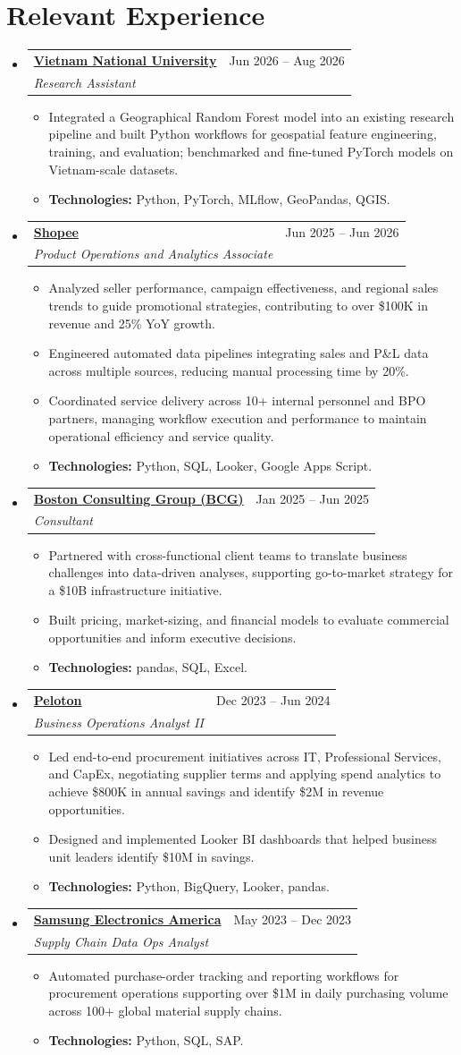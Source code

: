 \documentclass[a4paper,11pt]{article}
\makeatletter
\newcommand{\resumeItem}[1]{
  \item\small{
    {#1\par\vspace{-2pt}}
  }
}
\newcommand{\resumeSubheading}[4]{
  \vspace{-2pt}\item
    \begin{tabular*}{0.97\textwidth}[t]{l@{\extracolsep{\fill}}r}
      \textbf{#1} & #2 \\
      \textit{\small#3} & \textit{\small #4} \\
    \end{tabular*}\vspace{-7pt}
}
\newcommand{\resumeSubHeadingListStart}{\begin{itemize}[leftmargin=0.15in, label={}]}
\newcommand{\resumeSubHeadingListEnd}{\end{itemize}}
\newcommand{\resumeItemListStart}{\begin{itemize}}
\newcommand{\resumeItemListEnd}{\end{itemize}\vspace{-5pt}}
\makeatother
\begin{document}
\section{Relevant Experience}
\resumeSubHeadingListStart
  \resumeSubheading
    {\href{https://en.vnu.edu.vn/}{Vietnam National University}}{Jun 2026 -- Aug 2026}
    {Research Assistant}{}
    \resumeItemListStart
      \resumeItem{Integrated a Geographical Random Forest model into an existing research pipeline and built Python workflows for geospatial feature engineering, training, and evaluation; benchmarked and fine-tuned PyTorch models on Vietnam-scale datasets.}
      \resumeItem{\textbf{Technologies:} Python, PyTorch, MLflow, GeoPandas, QGIS.}
    \resumeItemListEnd
  \resumeSubheading
    {\href{https://www.sea.com/products/shopee}{Shopee}}{Jun 2025 -- Jun 2026}
    {Product Operations and Analytics Associate}{}
    \resumeItemListStart
      \resumeItem{Analyzed seller performance, campaign effectiveness, and regional sales trends to guide promotional strategies, contributing to over \$100K in revenue and 25\% YoY growth.}
      \resumeItem{Engineered automated data pipelines integrating sales and P\&L data across multiple sources, reducing manual processing time by 20\%.}
      \resumeItem{Coordinated service delivery across 10+ internal personnel and BPO partners, managing workflow execution and performance to maintain operational efficiency and service quality.}
      \resumeItem{\textbf{Technologies:} Python, SQL, Looker, Google Apps Script.}
    \resumeItemListEnd
  \resumeSubheading
    {\href{https://www.bcg.com/about/overview}{Boston Consulting Group (BCG)}}{Jan 2025 -- Jun 2025}
    {Consultant}{}
    \resumeItemListStart
      \resumeItem{Partnered with cross-functional client teams to translate business challenges into data-driven analyses, supporting go-to-market strategy for a \$10B infrastructure initiative.}
      \resumeItem{Built pricing, market-sizing, and financial models to evaluate commercial opportunities and inform executive decisions.}
      \resumeItem{\textbf{Technologies:} pandas, SQL, Excel.}
    \resumeItemListEnd
  \resumeSubheading
    {\href{https://www.onepeloton.com/company}{Peloton}}{Dec 2023 -- Jun 2024}
    {Business Operations Analyst II}{}
    \resumeItemListStart
      \resumeItem{Led end-to-end procurement initiatives across IT, Professional Services, and CapEx, negotiating supplier terms and applying spend analytics to achieve \$800K in annual savings and identify \$2M in revenue opportunities.}
      \resumeItem{Designed and implemented Looker BI dashboards that helped business unit leaders identify \$10M in savings.}
      \resumeItem{\textbf{Technologies:} Python, BigQuery, Looker, pandas.}
    \resumeItemListEnd
  \resumeSubheading
    {\href{https://www.samsung.com/us/about-us/our-business/}{Samsung Electronics America}}{May 2023 -- Dec 2023}
    {Supply Chain Data Ops Analyst}{}
    \resumeItemListStart
      \resumeItem{Automated purchase-order tracking and reporting workflows for procurement operations supporting over \$1M in daily purchasing volume across 100+ global material supply chains.}
      \resumeItem{\textbf{Technologies:} Python, SQL, SAP.}
    \resumeItemListEnd
\resumeSubHeadingListEnd
\end{document}
